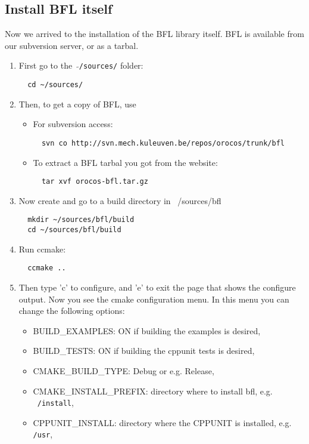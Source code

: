\documentclass[a4paper,10pt]{article}
\begin{document}
\subsection{Install BFL itself}
Now we arrived to the installation of the BFL library itself. BFL is
available from our subversion server, or as a tarbal.
\begin{enumerate}
\item First go to the \ $\mathtt{\tilde{ }}$\texttt{/sources/} folder:
\begin{verbatim}
  cd ~/sources/
\end{verbatim}
\item Then, to get a copy of BFL, use
 \begin{itemize}
 \item For subversion access:
\begin{verbatim}
  svn co http://svn.mech.kuleuven.be/repos/orocos/trunk/bfl
\end{verbatim}
 \item To extract a BFL tarbal you got from the website:
\begin{verbatim}
  tar xvf orocos-bfl.tar.gz
\end{verbatim}
\end{itemize}
\item Now create and go to a build directory in ~/sources/bfl
\begin{verbatim}
  mkdir ~/sources/bfl/build
  cd ~/sources/bfl/build
\end{verbatim}
\item Run ccmake:
\begin{verbatim}
  ccmake ..
\end{verbatim}
\item Then type 'c' to configure, and 'e' to exit the page that shows
  the configure output. Now you see the cmake configuration menu. In
  this menu you can change the following options:
\begin{itemize}
 \item BUILD\_EXAMPLES: ON if building the examples is desired,
 \item BUILD\_TESTS: ON if building the cppunit tests is desired,
 \item CMAKE\_BUILD\_TYPE: Debug or e.g. Release,
 \item CMAKE\_INSTALL\_PREFIX: directory where to install bfl, e.g. \texttt{~/install}, 
 \item CPPUNIT\_INSTALL: directory where the CPPUNIT is installed, e.g. \texttt{/usr},

\end{itemize}
\end{enumerate}
\end{document}
